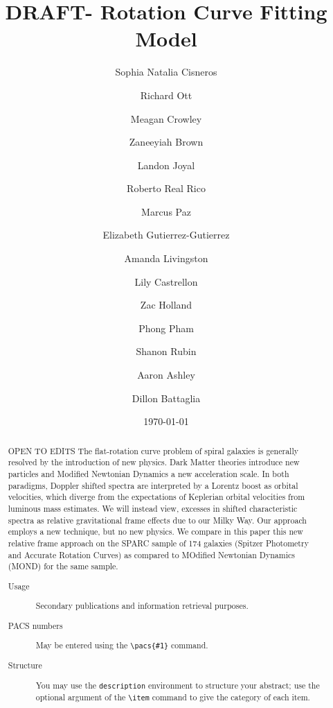\documentclass[reprint,%
 amsmath,amssymb,
 aps,
]{revtex4-1}
\begin{document}

\title{DRAFT- Rotation Curve Fitting Model }%


 

\author{Sophia Natalia Cisneros}
  \author{Richard Ott}%
 \author{ Meagan Crowley}
\email{ }
%


\author{Zaneeyiah Brown}
\author{Landon Joyal}
\author{Roberto Real Rico}
\author{Marcus Paz}
\author{Elizabeth Gutierrez-Gutierrez}
\author{Amanda Livingston}
\author{Lily Castrellon}
\author{Zac Holland}
\author{ Phong Pham}
\author{Shanon Rubin}
\author{Aaron Ashley}
\author{Dillon Battaglia}
%

%
% 

 
\date{\today}%
\begin{abstract}
{\color{teal}OPEN TO EDITS  }
The flat-rotation curve problem of spiral galaxies is generally resolved by the introduction of new physics.
 Dark Matter theories introduce new particles and Modified Newtonian Dynamics a new acceleration scale. In both paradigms,     Doppler shifted spectra     are interpreted by a Lorentz boost as  orbital velocities,  which diverge from the   expectations of Keplerian orbital velocities from luminous mass estimates. 
 We will instead view, excesses in shifted characteristic spectra  as relative gravitational frame effects due to our Milky Way. 
     Our   approach  employs  a new technique, but no new physics.  
 We compare in this paper  this new relative frame approach  on  the SPARC sample of 174 galaxies (Spitzer  Photometry and Accurate Rotation Curves) as  compared to MOdified Newtonian Dynamics (MOND) for the same  sample.  

\begin{description}
\item[Usage]
Secondary publications and information retrieval purposes.
\item[PACS numbers]
May be entered using the \verb+\pacs{#1}+ command.
\item[Structure]
You may use the \texttt{description} environment to structure your abstract;
use the optional argument of the \verb+\item+ command to give the category of each item. 
\end{description}
\end{abstract}
\end{document}
